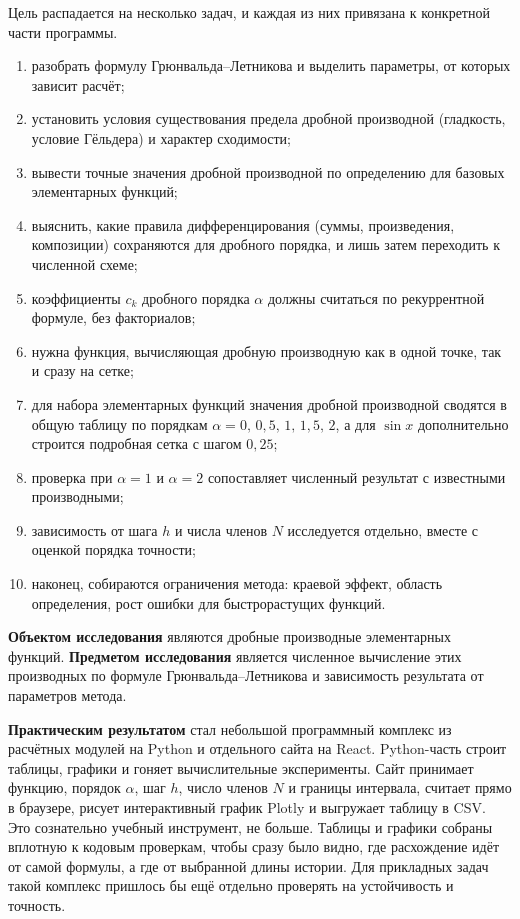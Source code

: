 \documentclass[14pt,a4paper]{extarticle}
\begin{document}
Цель распадается на несколько задач, и каждая из них привязана к конкретной части программы.
\begin{enumerate}
\item разобрать формулу Грюнвальда--Летникова и выделить параметры, от которых зависит расчёт;
\item установить условия существования предела дробной производной (гладкость, условие Гёльдера) и характер сходимости;
\item вывести точные значения дробной производной по определению для базовых элементарных функций;
\item выяснить, какие правила дифференцирования (суммы, произведения, композиции) сохраняются для дробного порядка, и лишь затем переходить к численной схеме;
\item коэффициенты $c_k$ дробного порядка $\alpha$ должны считаться по рекуррентной формуле, без факториалов;
\item нужна функция, вычисляющая дробную производную как в одной точке, так и сразу на сетке;
\item для набора элементарных функций значения дробной производной сводятся в общую таблицу по порядкам $\alpha=0,\,0{,}5,\,1,\,1{,}5,\,2$, а для $\sin x$ дополнительно строится подробная сетка с шагом $0{,}25$;
\item проверка при $\alpha=1$ и $\alpha=2$ сопоставляет численный результат с известными производными;
\item зависимость от шага $h$ и числа членов $N$ исследуется отдельно, вместе с оценкой порядка точности;
\item наконец, собираются ограничения метода: краевой эффект, область определения, рост ошибки для быстрорастущих функций.
\end{enumerate}

\textbf{Объектом исследования} являются дробные производные элементарных функций. \textbf{Предметом исследования} является численное вычисление этих производных по формуле Грюнвальда--Летникова и зависимость результата от параметров метода.

\textbf{Практическим результатом} стал небольшой программный комплекс из расчётных модулей на Python и отдельного сайта на React. Python-часть строит таблицы, графики и гоняет вычислительные эксперименты. Сайт принимает функцию, порядок $\alpha$, шаг $h$, число членов $N$ и границы интервала, считает прямо в браузере, рисует интерактивный график Plotly и выгружает таблицу в CSV. Это сознательно учебный инструмент, не больше. Таблицы и графики собраны вплотную к кодовым проверкам, чтобы сразу было видно, где расхождение идёт от самой формулы, а где от выбранной длины истории. Для прикладных задач такой комплекс пришлось бы ещё отдельно проверять на устойчивость и точность.
\end{document}
